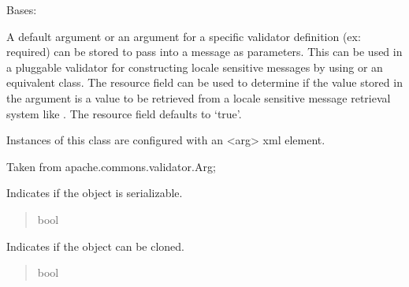 \documentclass[letterpaper,10pt,english]{sphinxmanual}
\begin{document}
\begin{fulllineitems}
\label{\detokenize{apache_commons_validator_python:apache_commons_validator_python.arg_new.Arg}}
\pysigstartsignatures
{}
\pysigstopsignatures
\sphinxAtStartPar
Bases: 

\sphinxAtStartPar
A default argument or an argument for a specific validator definition (ex:
required) can be stored to pass into a message as parameters. This can be used in a
pluggable validator for constructing locale sensitive messages by using
 or an equivalent class.  The resource field can be used to determine
if the value stored in the argument is a value to be retrieved from a locale
sensitive message retrieval system like . The
resource field defaults to ‘true’.

\sphinxAtStartPar
Instances of this class are configured with an \textless{}arg\textgreater{} xml element.

\sphinxAtStartPar
Taken from apache.commons.validator.Arg;

\begin{fulllineitems}
\label{\detokenize{apache_commons_validator_python:apache_commons_validator_python.arg_new.Arg.serializable}}
\pysigstartsignatures
{}
\pysigstopsignatures
\sphinxAtStartPar
Indicates if the object is serializable.
\begin{quote}\begin{description}
\sphinxAtStartPar
bool

\end{description}\end{quote}

\end{fulllineitems}


\begin{fulllineitems}
\label{\detokenize{apache_commons_validator_python:apache_commons_validator_python.arg_new.Arg.cloneable}}
\pysigstartsignatures
{}
\pysigstopsignatures
\sphinxAtStartPar
Indicates if the object can be cloned.
\begin{quote}\begin{description}
\sphinxAtStartPar
bool


\end{description}
\end{quote}
\end{fulllineitems}
\end{fulllineitems}
\end{document}
